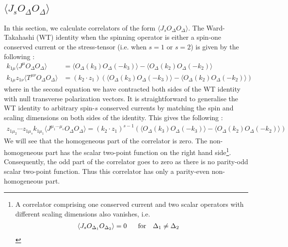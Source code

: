 \documentclass[a4paper,11pt]{article}
\begin{document}
\subsection{$\langle J_s O_{\Delta} O_{\Delta}\rangle$}
\label{jsododshsection}
In this section, we calculate correlators of the form $\langle J_s O_{\Delta}O_{\Delta} \rangle$. The Ward-Takahashi (WT) identity when the spinning operator is either a spin-one conserved current or the stress-tensor (i.e. when $s=1$ or $s=2$) is given by the following \cite{Bzowski:2013sza, Baumann:2020dch}:
\begin{align}\label{jToowi}
k_{1\mu}\langle J^{\mu}O_{\Delta}O_{\Delta} \rangle &= \langle O_{\Delta}(k_3)O_{\Delta}(-k_3) \rangle -\langle O_{\Delta}(k_2)O_{\Delta}(-k_2) \rangle\nonumber\\
k_{1\mu}z_{1\nu}\langle T^{\mu\nu}O_{\Delta}O_{\Delta}\rangle &= (k_2 \cdot z_1)\left(\langle O_{\Delta}(k_3)O_{\Delta}(-k_3) \rangle -\langle O_{\Delta}(k_2)O_{\Delta}(-k_2) \rangle\right)
\end{align}
where in the second equation we have contracted both sides of the WT identity with null transverse polarization vectors.
It is straightforward to generalise the WT identity to arbitrary spin-$s$ conserved currents by matching the spin and scaling dimensions on both sides of the identity. This gives the following :
\begin{align}\label{jsoowi}
z_{1\mu_2}\cdots z_{1\mu_s}k_{1\mu_1}\langle J^{\mu_1 \cdots \mu_s} O_{\Delta} O_{\Delta} \rangle = (k_2 \cdot z_1)^{s-1}(\langle O_{\Delta}(k_3)O_{\Delta}(-k_3) \rangle-\langle O_{\Delta}(k_2)O_{\Delta}(-k_2) \rangle)
\end{align}
We will see that the homogeneous part of the correlator is zero. The non-homogeneous part has the scalar two-point function on the right hand side\footnote{A correlator comprising one conserved current and two scalar operators with different scaling dimensions also vanishes, i.e.
\begin{align}
\langle J_s O_{\Delta_1}O_{\Delta_2} \rangle &= 0~~~~~\rm{for~~~ \Delta_1 \ne \Delta_2}
\end{align}}. 
Consequently, the odd part of the correlator goes to zero as there is no parity-odd scalar two-point function. Thus this correlator has only a parity-even non-homogeneous part.
\end{document}
